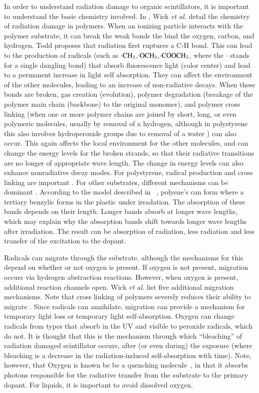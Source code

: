 In order to understand radiation damage to organic scintillators, it is important to
understand the basic chemistry involved.
In \cite{Wulkop1995141}, Wick {\it{et al.}} detail
the chemistry of radiation damage in polymers. 
When an ionizing particle interacts with the polymer substrate, it can
break the weak bonds the bind the oxygen, carbon, and hydrogen.
Todd\cite{todd} proposes that radiation first ruptures a C-H bond.
This can lead to the production
of radicals (such as  ${\rm \cdot CH_3}$,${\rm \cdot OCH_3}$,${\rm \cdot COOCH_3}$, where the $\cdot$ stands for a single dangling bond)
that absorb fluorescence light (color center) and lead to 
a permanent increase in light self absorption.
They can affect the environment of the other molecules, leading to
an increase of non-radiative decays.
When these bonds are broken, gas creation (evolution), polymer degradation (breakage 
of the polymer main chain (backbone) to the original monomer), 
and polymer cross linking
(when one or more polymer chains are joined by short, long, or even
polymeric molecules, usually by removal of a hydrogen,
although in polystyrene this also involves hydroperoxide groups due to removal of a water \cite{todd})
can also occur\cite{Wick1991472}.  
This again affects the local environment for the other molecules, and
can
change the energy levels for the broken strands, so that their
radiative transitions are no longer of appropriate wave length.
The change in energy levels can also enhance nonradiative decay modes.
For polystyrene, radical production and cross linking
are important \cite{Wick1991472}.  For other substrates, different
mechanisms can be dominant \cite{Wick1991472}.
According to the model described in ~\cite{kauffman}, polyene's
can form where a tertiary benzylic forms in the plastic under irradation.
The absorption of these bands depends on their length.  Longer bands
absorb at longer wave lengths, which may explain why the absorption bands
shift towards longer wave lengths after irradiation.
The result can be absorption of radiation,
less radiation and less transfer of the
excitation to the dopant.


Radicals
can migrate through the substrate, although the mechanisms for this
depend on whether or not oxygen is present.  If oxygen
is not present, migration occurs via hydrogen abstraction reactions.
However, when oxygen is present, additional reaction channels open.
Wick {\it{et al.}} list five additional migration mechanisms.
Note that cross linking of polymers severely reduces their
ability to migrate \cite{weir}.
Since radicals can
annihilate, migration can provide  a mechanism for
temporary light loss or temporary light self-absorption.   
Oxygen can change radicals
from types that absorb in the UV and visible to peroxide radicals,
which do not.  It is thought that this is the mechanism
through which ``bleaching'' of radiation damaged scintillator
occurs, after (or even during) the exposure (where bleaching
is a decrease in the radiation-induced self-absorption with time).
Note, however, that Oxygen is known be be a quenching molecule~\cite{sauli}, 
in that it absorbs photons responsible for the radiative transfer
from the substrate to the primary dopant.  For liquids, it is important
to avoid dissolved oxygen.


